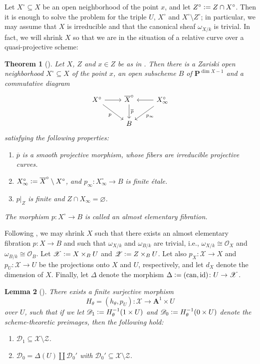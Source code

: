 \documentclass[a4paper, oneside, english,reqno]{amsart}
\theoremstyle{plain}
\newtheorem{theorem}{Theorem}[section]
\newtheorem{lemma}[theorem]{Lemma}
\theoremstyle{definition}
\theoremstyle{remark}
\newcommand{\ol}{\overline}
\newcommand{\defeq}{\vcentcolon=}
\newcommand{\A}{\mathbf{A}}
\newcommand{\PP}{\mathbf{P}}
\newcommand{\scrD}{\mathscr{D}}
\newcommand{\scrX}{\mathscr{X}}
\newcommand{\scrZ}{\mathscr{Z}}
\newcommand{\calO}{\mathcal{O}}
\newcommand{\can}{\mathrm{can}}
\DeclareMathOperator{\id}{id}
\begin{document}
Let $X^\circ\subseteq X$ be an open neighborhood of the point $x$, and let $Z^\circ\defeq Z\cap X^\circ$. Then it is enough to solve the problem for the triple $U$, $X^\circ$ and $X^\circ\setminus Z^\circ$; in particular, we may assume that $X$ is irreducible and that the canonical sheaf $\omega_{X/k}$ is trivial. In fact, we will shrink $X$ so that we are in the situation of a relative curve over a quasi-projective scheme:

\begin{theorem}[]
Let $X$, $Z$ and $x\in Z$ be as in . Then there is a Zariski open neighborhood $X^\circ\subseteq X$ of the point $x$, an open subscheme $B$ of $\PP^{\dim X-1}$ and a commutative diagram
\[\begin{tikzcd}
  X^\circ\ar[r]\ar[dr,swap,"p"] & \ol X^\circ\ar[d,"\ol p"] & X_\infty^\circ\ar[l,swap]\ar[dl,"p_\infty"]\\
& B &
\end{tikzcd}\]
satisfying the following properties:
\begin{enumerate}
\item[$(1)$] $\ol p$ is a smooth projective morphism, whose fibers are irreducible projective curves.
\item[$(2)$] $X^\circ_\infty\defeq\ol X^\circ\setminus X^\circ$, and $p_\infty\colon X^\circ_\infty\to B$ is finite étale.
\item[$(3)$] $p|_Z$ is finite and $Z\cap X_\infty=\varnothing$. 
\end{enumerate}
The morphism $p\colon X^\circ\to B$ is called an \em{almost elementary fibration}.
\end{theorem}

Following \cite[§7]{hty-inv}, we may shrink $X$ such that there exists an almost elementary fibration $p\colon X\to B$ and such that $\omega_{X/k}$ and $\omega_{B/k}$ are trivial, i.e., $\omega_{X/k}\cong\calO_X$ and $\omega_{B/k}\cong\calO_B$.
Let $\scrX\defeq X\times_BU$ and $\scrZ\defeq Z\times_BU$. Let also $p_X\colon\scrX\to X$ and $p_U\colon\scrX\to U$ be the projections onto $X$ and $U$, respectively, and let $d_X$ denote the dimension of $X$. Finally, let $\Delta$ denote the morphism $\Delta\defeq(\can,\id)\colon U\to \scrX$.

\begin{lemma}[]\label{lemma:nice-map}
There exists a finite surjective morphism 
\[
H_\theta=(h_\theta,p_U)\colon \scrX\to \A^1\times U
\]
over $U$, such that if we let $\scrD_1\defeq H_\theta^{-1}(1\times U)$ and $\scrD_0\defeq H_\theta^{-1}(0\times U)$ denote the scheme-theoretic preimages, then the following hold:
\begin{enumerate}
\item[$(1)$] $\scrD_1\subseteq \scrX\setminus\scrZ$.
\item[$(2)$] $\scrD_0=\Delta(U)\amalg\scrD_0'$ with $\scrD_0'\subseteq\scrX\setminus\scrZ$.
\end{enumerate}
\end{lemma} 
\end{document}
